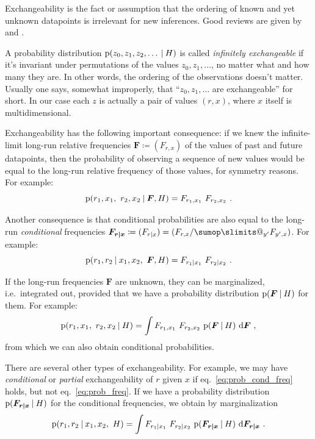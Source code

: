 \documentclass[\ifafour a4paper,12pt,\else a5paper,10pt,\fi%
onecolumn,oneside,article,%
british%
]{memoir}
\makeatletter
\theoremstyle{remark}
\theoremstyle{innote}
\def\sum{\DOTSI\sumop\slimits@}
\newcommand*{\di}{\mathrm{d}}%
\newcommand*{\defd}{\coloneqq}
\newcommand*{\p}{\mathrm{p}}%
\renewcommand*{\|}[1][]{\nonscript\:#1\vert\nonscript\:\mathopen{}}
\renewcommand*{\=}{\TextOrMath\texteq\eq}
\newcommand*{\sect}{\S}%
\newcommand*{\eqn}{eq.}%
\newcommand*{\ie}{{i.e.}}
\newcommand*{\yF}{\bm{F}}
\newcommand*{\yFrx}{\yF_{\bm{r\mid x}}}
\makeatother
\begin{document}
Exchangeability is the fact or assumption that the ordering of
known and yet unknown datapoints is irrelevant for new inferences. Good
reviews are given by \textcite{dawid2013} and
\textcite[\sect~4.2]{bernardoetal1994}.

A probability distribution $\p(z_{0}, z_{1}, z_{2}, \dotsc \| H)$ is called
\emph{infinitely exchangeable} if it's invariant under permutations of the
values $z_{0}, z_{1}, \dotsc$, no matter what and how many they are. In
other words, the ordering of the observations doesn't matter. Usually one
says, somewhat improperly, that \enquote{$z_{0}, z_{1}, \dotsc$ are
  exchangeable} for short. In our case each $z$ is actually a pair of
values $(r,x)$, where $x$ itself is multidimensional.

Exchangeability has the following important consequence: if we knew the
infinite-limit long-run relative frequencies $\yF\defd (F_{r,x})$ of the
values of past and future datapoints, then the probability of observing a
sequence of new values would be equal to the long-run relative frequency of
those values, for symmetry reasons. For example:
\begin{equation}
  \label{eq:prob_freq}
  \p(r_{1},x_{1},\ r_{2},x_{2} \| \yF, H) = F_{r_{1},x_{1}} \ 
  F_{r_{2},x_{2}} \ .
\end{equation}

Another consequence is that conditional probabilities are also equal to the
long-run \emph{conditional} frequencies $\yFrx \defd (F_{r \|x}) =
(F_{r,x}/\sum_{y'}F_{y',x})$. For example:
\begin{equation}
  \label{eq:prob_cond_freq}
  \p(r_{1}, r_{2}\| x_{1}, x_{2},\ \yF, H) = F_{r_{1}\|x_{1}} \ 
  F_{r_{2}\|x_{2}} \ .
\end{equation}

If the long-run frequencies $\yF$ are unknown, they can be marginalized,
\ie\ integrated out, provided that we have a probability distribution
$\p(\yF \| H)$ for them. For example:
\begin{equation}
  \label{eq:prob_freq_integr}
  \p(r_{1},x_{1},\ r_{2},x_{2}\| H) = \int F_{r_{1},x_{1}} \ 
  F_{r_{2},x_{2}} \ \p(\yF \| H)\ \di\yF \ ,
\end{equation}
from which we can also obtain conditional probabilities.

There are several other types of exchangeability. For example, we may have
\emph{conditional} or \emph{partial} exchangeability of $r$ given $x$ if
\eqn~\eqref{eq:prob_cond_freq} holds, but not \eqn~\eqref{eq:prob_freq}. If
we have a probability distribution $\p(\yFrx \| H)$ for the conditional
frequencies, we obtain by marginalization
\begin{equation}
  \label{eq:prob_cond_freq_integr}
  \p(r_{1}, r_{2}\| x_{1}, x_{2},\ H) = \int F_{r_{1}\|x_{1}} \ 
  F_{r_{2}\|x_{2}}\ \p(\yFrx \| H)\ \di\yFrx \ .
\end{equation}
\end{document}
